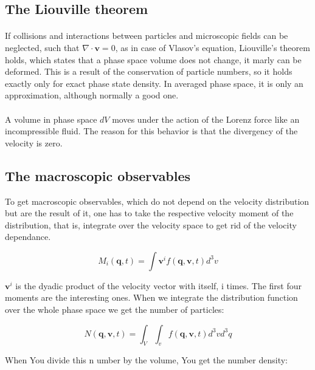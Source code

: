 \documentclass[a4paper,10pt]{report}
\begin{document}
\subsection{The Liouville theorem}
\paragraph*{}
If collisions and interactions between particles and microscopic fields can be neglected, such that $\nabla \cdot \mathbf{v}=0$, as in case of Vlasov's equation, Liouville's theorem holds, which states that a phase space volume does not change, it marly can be deformed. This is a result of the conservation of particle numbers, so it holds exactly only for exact phase state density. In averaged phase space, it is only an approximation, although normally a good one.

\paragraph*{}
A volume in phase space $dV$ moves under the action of the Lorenz force like an incompressible fluid. The reason for this behavior is that the divergency of the velocity is zero.

\subsection{The macroscopic observables}
To get macroscopic observables, which do not depend on the velocity distribution but are the result of it, one has to take the respective velocity moment of the distribution, that is, integrate over the velocity space to get rid of the velocity dependance.

\begin{equation}\label{velocity_moment_allgemein}
    M_i(\mathbf{q},t)=\int \mathbf{v}^i f(\mathbf{q,v},t)d^3v
\end{equation}

$\mathbf{v}^i$ is the dyadic product of the velocity vector with itself, i times. The first four moments are the interesting ones. When we integrate the distribution function over the whole phase space we get the number of particles:

\begin{equation}\label{particle number}
    N(\mathbf{q,v},t)=\int_V \int_v f(\mathbf{q,v},t)d^3v d^3q
\end{equation}

When You divide this n umber by the volume, You get the number density:
\end{document}
